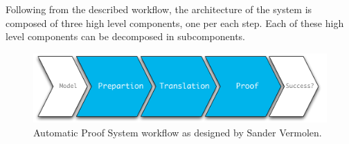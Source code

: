 \documentclass[]{article}
\begin{document}
Following from the described workflow, the architecture of the system is composed of three high level components, one per each step.
Each of these high level components can be decomposed in subcomponents.

\begin{figure}
  \begin{center}
    \includegraphics[width=.6\textwidth]{images/pic_arch.pdf}
    \caption[APS workflow]{Automatic Proof System workflow as designed by Sander Vermolen.}
    \label{fig:sander_arch}
  \end{center}
\end{figure}
\end{document}
